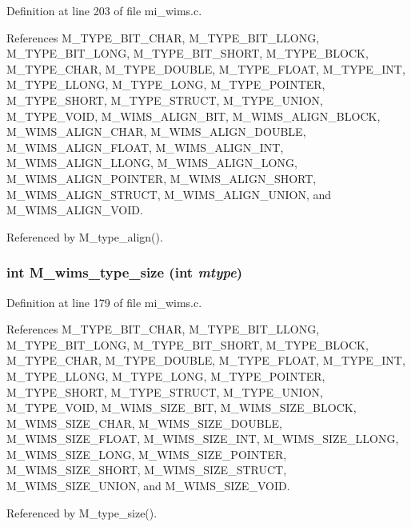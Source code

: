 Definition at line 203 of file mi\_\-wims.c.

References M\_\-TYPE\_\-BIT\_\-CHAR, M\_\-TYPE\_\-BIT\_\-LLONG, M\_\-TYPE\_\-BIT\_\-LONG, M\_\-TYPE\_\-BIT\_\-SHORT, M\_\-TYPE\_\-BLOCK, M\_\-TYPE\_\-CHAR, M\_\-TYPE\_\-DOUBLE, M\_\-TYPE\_\-FLOAT, M\_\-TYPE\_\-INT, M\_\-TYPE\_\-LLONG, M\_\-TYPE\_\-LONG, M\_\-TYPE\_\-POINTER, M\_\-TYPE\_\-SHORT, M\_\-TYPE\_\-STRUCT, M\_\-TYPE\_\-UNION, M\_\-TYPE\_\-VOID, M\_\-WIMS\_\-ALIGN\_\-BIT, M\_\-WIMS\_\-ALIGN\_\-BLOCK, M\_\-WIMS\_\-ALIGN\_\-CHAR, M\_\-WIMS\_\-ALIGN\_\-DOUBLE, M\_\-WIMS\_\-ALIGN\_\-FLOAT, M\_\-WIMS\_\-ALIGN\_\-INT, M\_\-WIMS\_\-ALIGN\_\-LLONG, M\_\-WIMS\_\-ALIGN\_\-LONG, M\_\-WIMS\_\-ALIGN\_\-POINTER, M\_\-WIMS\_\-ALIGN\_\-SHORT, M\_\-WIMS\_\-ALIGN\_\-STRUCT, M\_\-WIMS\_\-ALIGN\_\-UNION, and M\_\-WIMS\_\-ALIGN\_\-VOID.

Referenced by M\_\-type\_\-align().
\subsubsection{\setlength{\rightskip}{0pt plus 5cm}int M\_\-wims\_\-type\_\-size (int {\em mtype})}\label{mi__wims_8c_82067885f67db7075a7f0cec975bbe2e}




Definition at line 179 of file mi\_\-wims.c.

References M\_\-TYPE\_\-BIT\_\-CHAR, M\_\-TYPE\_\-BIT\_\-LLONG, M\_\-TYPE\_\-BIT\_\-LONG, M\_\-TYPE\_\-BIT\_\-SHORT, M\_\-TYPE\_\-BLOCK, M\_\-TYPE\_\-CHAR, M\_\-TYPE\_\-DOUBLE, M\_\-TYPE\_\-FLOAT, M\_\-TYPE\_\-INT, M\_\-TYPE\_\-LLONG, M\_\-TYPE\_\-LONG, M\_\-TYPE\_\-POINTER, M\_\-TYPE\_\-SHORT, M\_\-TYPE\_\-STRUCT, M\_\-TYPE\_\-UNION, M\_\-TYPE\_\-VOID, M\_\-WIMS\_\-SIZE\_\-BIT, M\_\-WIMS\_\-SIZE\_\-BLOCK, M\_\-WIMS\_\-SIZE\_\-CHAR, M\_\-WIMS\_\-SIZE\_\-DOUBLE, M\_\-WIMS\_\-SIZE\_\-FLOAT, M\_\-WIMS\_\-SIZE\_\-INT, M\_\-WIMS\_\-SIZE\_\-LLONG, M\_\-WIMS\_\-SIZE\_\-LONG, M\_\-WIMS\_\-SIZE\_\-POINTER, M\_\-WIMS\_\-SIZE\_\-SHORT, M\_\-WIMS\_\-SIZE\_\-STRUCT, M\_\-WIMS\_\-SIZE\_\-UNION, and M\_\-WIMS\_\-SIZE\_\-VOID.

Referenced by M\_\-type\_\-size().